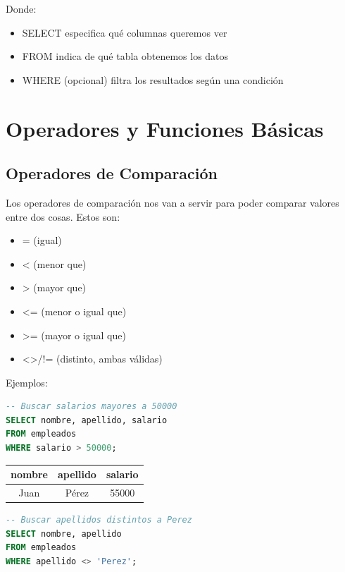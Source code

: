 \documentclass[12pt]{article}
\begin{document}
Donde:
\begin{itemize}
    \item SELECT especifica qué columnas queremos ver
    \item FROM indica de qué tabla obtenemos los datos
    \item WHERE (opcional) filtra los resultados según una condición
\end{itemize}

\section{Operadores y Funciones Básicas}
\subsection{Operadores de Comparación}
Los operadores de comparación nos van a servir para poder comparar valores entre dos cosas. Estos son:
\begin{itemize}
    \item = (igual)
    \item < (menor que)
    \item > (mayor que)
    \item <= (menor o igual que)
    \item >= (mayor o igual que)
    \item <>/!= (distinto, ambas válidas)
\end{itemize}

\vspace{1em}

Ejemplos:
\begin{lstlisting}[language=SQL]
-- Buscar salarios mayores a 50000
SELECT nombre, apellido, salario
FROM empleados
WHERE salario > 50000;
\end{lstlisting}

\begin{center}
\begin{tabular}{ccc}
\toprule
nombre & apellido & salario \\
\midrule
Juan & Pérez & 55000 \\
\bottomrule
\end{tabular}
\end{center}

\begin{lstlisting}[language=SQL]
-- Buscar apellidos distintos a Perez
SELECT nombre, apellido
FROM empleados
WHERE apellido <> 'Perez';
\end{lstlisting}
\end{document}
